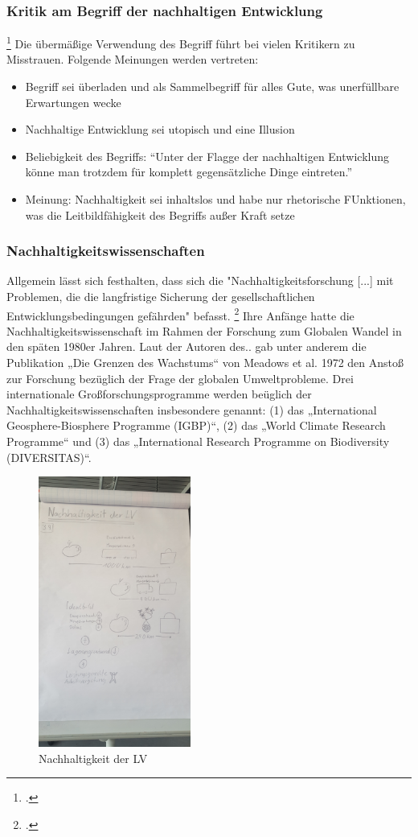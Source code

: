 \documentclass{scrartcl}
\begin{document}
\subsubsection{Kritik am Begriff der nachhaltigen Entwicklung}\footcite{NachhaltigeBrockhaus.de}
Die übermäßige Verwendung des Begriff führt bei vielen Kritikern zu Misstrauen. Folgende Meinungen werden vertreten:

\begin{itemize}
\item Begriff sei überladen und als Sammelbegriff für alles Gute, was unerfüllbare Erwartungen wecke
\item Nachhaltige Entwicklung sei utopisch und eine Illusion
\item Beliebigkeit des Begriffs: “Unter der Flagge der nachhaltigen Entwicklung könne man trotzdem für komplett gegensätzliche Dinge eintreten.”
\item Meinung: Nachhaltigkeit sei inhaltslos und habe nur rhetorische FUnktionen, was die Leitbildfähigkeit des Begriffs außer Kraft setze
\end{itemize}

\subsubsection{Nachhaltigkeitswissenschaften}
Allgemein lässt sich festhalten, dass sich die "Nachhaltigkeitsforschung [...] mit Problemen, die die langfristige Sicherung der gesellschaftlichen Entwicklungsbedingungen gefährden" befasst.  \footcite{MichelsenGrundlagenEntwicklung, S.126}
Ihre Anfänge hatte die Nachhaltigkeitswissenschaft im Rahmen der Forschung zum Globalen Wandel in den späten 1980er Jahren. Laut der Autoren des..  gab unter anderem die Publikation „Die Grenzen des Wachstums“ von Meadows et al. 1972 den Anstoß zur Forschung bezüglich der Frage der globalen Umweltprobleme.
Drei internationale Großforschungsprogramme werden beüglich der Nachhaltigkeitswissenschaften insbesondere genannt: (1) das „International Geosphere-Biosphere Programme (IGBP)“, (2) das „World Climate Research Programme“ und (3) das
„International Research Programme on Biodiversity (DIVERSITAS)“.


\begin{figure}[htp]
\centering
\includegraphics[width=5cm]{image_folder/skizze1.jpg}
\caption{Nachhaltigkeit der LV}
\label{fig:Skizze_Nachhaltigkeit}
\end{figure}
\end{document}
